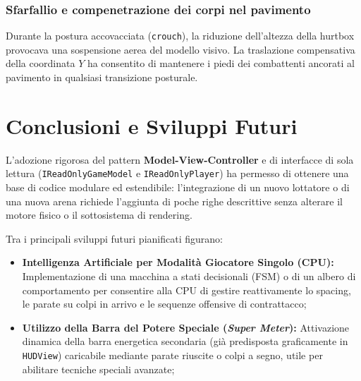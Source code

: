 \documentclass[11pt, a4paper]{article}
\begin{document}
\subsubsection{Sfarfallio e compenetrazione dei corpi nel pavimento}
	Durante la postura accovacciata (\texttt{crouch}), la riduzione dell'altezza della hurtbox provocava una sospensione aerea del modello visivo. La traslazione compensativa della coordinata $Y$ ha consentito di mantenere i piedi dei combattenti ancorati al pavimento in qualsiasi transizione posturale.

\newpage

\section{Conclusioni e Sviluppi Futuri}
L'adozione rigorosa del pattern \textbf{Model-View-Controller} e di interfacce di sola lettura (\texttt{IReadOnlyGameModel} e \texttt{IReadOnlyPlayer}) ha permesso di ottenere una base di codice modulare ed estendibile: l'integrazione di un nuovo lottatore o di una nuova arena richiede l'aggiunta di poche righe descrittive senza alterare il motore fisico o il sottosistema di rendering.

Tra i principali sviluppi futuri pianificati figurano:
\begin{itemize}
    \item \textbf{Intelligenza Artificiale per Modalità Giocatore Singolo (CPU):} Implementazione di una macchina a stati decisionali (FSM) o di un albero di comportamento per consentire alla CPU di gestire reattivamente lo spacing, le parate su colpi in arrivo e le sequenze offensive di contrattacco;
    \item \textbf{Utilizzo della Barra del Potere Speciale (\emph{Super Meter}):} Attivazione dinamica della barra energetica secondaria (già predisposta graficamente in \texttt{HUDView}) caricabile mediante parate riuscite o colpi a segno, utile per abilitare tecniche speciali avanzate;
\end{itemize}

\newpage

\end{document}
